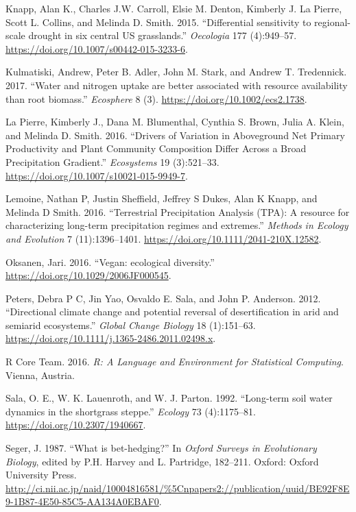 \documentclass[fleqn,10pt,lineno]{wlpeerj} %
\begin{document}
\leavevmode\hypertarget{ref-Knapp2015}{}%
Knapp, Alan K., Charles J.W. Carroll, Elsie M. Denton, Kimberly J. La
Pierre, Scott L. Collins, and Melinda D. Smith. 2015. ``Differential
sensitivity to regional-scale drought in six central US grasslands.''
\emph{Oecologia} 177 (4):949--57.
\url{https://doi.org/10.1007/s00442-015-3233-6}.

\leavevmode\hypertarget{ref-Kulmatiski2017a}{}%
Kulmatiski, Andrew, Peter B. Adler, John M. Stark, and Andrew T.
Tredennick. 2017. ``Water and nitrogen uptake are better associated with
resource availability than root biomass.'' \emph{Ecosphere} 8 (3).
\url{https://doi.org/10.1002/ecs2.1738}.

\leavevmode\hypertarget{ref-LaPierre2016}{}%
La Pierre, Kimberly J., Dana M. Blumenthal, Cynthia S. Brown, Julia A.
Klein, and Melinda D. Smith. 2016. ``Drivers of Variation in Aboveground
Net Primary Productivity and Plant Community Composition Differ Across a
Broad Precipitation Gradient.'' \emph{Ecosystems} 19 (3):521--33.
\url{https://doi.org/10.1007/s10021-015-9949-7}.

\leavevmode\hypertarget{ref-Lemoine2016}{}%
Lemoine, Nathan P, Justin Sheffield, Jeffrey S Dukes, Alan K Knapp, and
Melinda D Smith. 2016. ``Terrestrial Precipitation Analysis (TPA): A
resource for characterizing long-term precipitation regimes and
extremes.'' \emph{Methods in Ecology and Evolution} 7 (11):1396--1401.
\url{https://doi.org/10.1111/2041-210X.12582}.

\leavevmode\hypertarget{ref-Oksanen2016}{}%
Oksanen, Jari. 2016. ``Vegan: ecological diversity.''
\url{https://doi.org/10.1029/2006JF000545}.

\leavevmode\hypertarget{ref-Peters2012}{}%
Peters, Debra P C, Jin Yao, Osvaldo E. Sala, and John P. Anderson. 2012.
``Directional climate change and potential reversal of desertification
in arid and semiarid ecosystems.'' \emph{Global Change Biology} 18
(1):151--63. \url{https://doi.org/10.1111/j.1365-2486.2011.02498.x}.

\leavevmode\hypertarget{ref-R2016}{}%
R Core Team. 2016. \emph{R: A Language and Environment for Statistical
Computing}. Vienna, Austria.

\leavevmode\hypertarget{ref-Sala1992a}{}%
Sala, O. E., W. K. Lauenroth, and W. J. Parton. 1992. ``Long-term soil
water dynamics in the shortgrass steppe.'' \emph{Ecology} 73
(4):1175--81. \url{https://doi.org/10.2307/1940667}.

\leavevmode\hypertarget{ref-Seger1987}{}%
Seger, J. 1987. ``What is bet-hedging?'' In \emph{Oxford Surveys in
Evolutionary Biology}, edited by P.H. Harvey and L. Partridge, 182--211.
Oxford: Oxford University Press.
\url{http://ci.nii.ac.jp/naid/10004816581/\%5Cnpapers2://publication/uuid/BE92F8E9-1B87-4E50-85C5-AA134A0EBAF0}.
\end{document}
